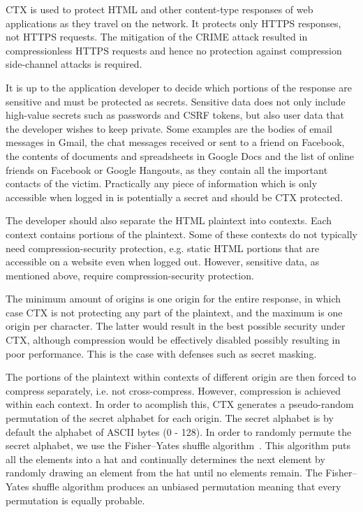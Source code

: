 \documentclass[a4paper, 11 pt, conference]{article}  %
\begin{document}
CTX is used to protect HTML and other content-type responses of web applications as they travel on the network. It protects only HTTPS responses, not HTTPS requests. The mitigation of the CRIME attack resulted in compressionless HTTPS requests and hence no protection against compression side-channel attacks is required.

It is up to the application developer to decide which portions of the response
are sensitive and must be protected as secrets. Sensitive data does not only
include high-value secrets such as passwords and CSRF tokens, but also user data
that the developer wishes to keep private. Some examples are the bodies of email
messages in Gmail, the chat messages received or sent to a friend on Facebook,
the contents of documents and spreadsheets in Google Docs and the list of online
friends on Facebook or Google Hangouts, as they contain all the important
contacts of the victim. Practically any piece of information which is only
accessible when logged in is potentially a secret and should be CTX
protected.

The developer should also separate the HTML plaintext into contexts. Each context contains portions of the plaintext. Some of these contexts do not typically need compression-security protection, e.g. static HTML portions that are accessible on a website even when logged out. However, sensitive data, as mentioned above, require compression-security protection.

The minimum amount of origins is one origin for the entire response, in which case CTX is not protecting any part of the plaintext, and the maximum is one origin per character. The latter would result in the best possible security under CTX, although compression would be effectively disabled possibly resulting in poor performance. This is the case with defenses such as secret masking.

The portions of the plaintext within contexts of different origin are then
forced to compress separately, i.e. not cross-compress. However, compression is
achieved within each context. In order to acomplish this, CTX generates a
pseudo-random permutation of the secret alphabet for each origin. The secret
alphabet is by default the alphabet of ASCII bytes (0 - 128). In order to
randomly permute the secret alphabet, we use the Fisher--Yates shuffle
algorithm~\cite{c12}. This algorithm puts all the elements into a
hat and continually determines the next element by randomly drawing an element
from the hat until no elements remain. The Fisher--Yates shuffle algorithm
produces an unbiased permutation meaning that every permutation is equally
probable.
\end{document}

